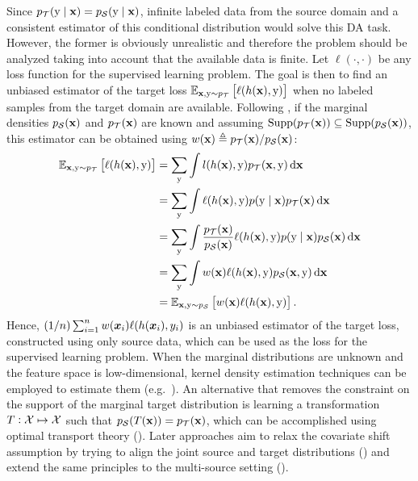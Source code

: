Since $p_{\mathcal{T}}({\textnormal{y}} \mid {\mathbf{x}}) = p_{\mathcal{S}}({\textnormal{y}} \mid {\mathbf{x}})$, infinite labeled data from the source domain and a consistent estimator of this conditional distribution would solve this DA task. However, the former is obviously unrealistic and therefore the problem should be analyzed taking into account that the available data is finite. Let $\ell(\cdot, \cdot)$ be any loss function for the supervised learning problem. The goal is then to find an unbiased estimator of the target loss $\mathbb{E}_{{\mathbf{x}}, {\textnormal{y}} \sim p_{\mathcal{T}}} \left[\ell(h({\mathbf{x}}),{\textnormal{y}})\right]$ when no labeled samples from the target domain are available. Following \citet{Sugiyama2007}, if the marginal densities $p_{\mathcal{S}}({\mathbf{x}})$ and $p_{\mathcal{T}}({\mathbf{x}})$ are known and assuming $\mathrm{Supp}(p_{\mathcal{T}}({\mathbf{x}})) \subseteq \mathrm{Supp}(p_{\mathcal{S}}({\mathbf{x}}))$, this estimator can be obtained using  $w({\mathbf{x}}) \triangleq p_{\mathcal{T}}({\mathbf{x}})/p_{\mathcal{S}}({\mathbf{x}})$:
\begin{align}
    \mathbb{E}_{{\mathbf{x}}, {\textnormal{y}} \sim p_{\mathcal{T}}} \left[\ell(h({\mathbf{x}}),{\textnormal{y}})\right] &= \sum_{{\textnormal{y}}} \int l(h({\mathbf{x}}),{\textnormal{y}}) p_{\mathcal{T}}({\mathbf{x}}, {\textnormal{y}}) {\,\text{d}}{\mathbf{x}} \nonumber\\
    &= \sum_{{\textnormal{y}}} \int \ell(h({\mathbf{x}}),{\textnormal{y}}) p({\textnormal{y}} \mid {\mathbf{x}}) p_{\mathcal{T}}({\mathbf{x}}) {\,\text{d}}{\mathbf{x}} \nonumber\\
    &= \sum_{{\textnormal{y}}} \int \frac{p_{\mathcal{T}}({\mathbf{x}})}{p_{\mathcal{S}}({\mathbf{x}})} \ell(h({\mathbf{x}}),{\textnormal{y}})  p({\textnormal{y}} \mid {\mathbf{x}}) p_{\mathcal{S}}({\mathbf{x}}) {\,\text{d}}{\mathbf{x}} \nonumber\\
    &= \sum_{{\textnormal{y}}} \int w({\mathbf{x}}) \ell(h({\mathbf{x}}),{\textnormal{y}})  p_{\mathcal{S}}({\mathbf{x}}, {\textnormal{y}}) {\,\text{d}}{\mathbf{x}} \nonumber\\
    &= \mathbb{E}_{{\mathbf{x}}, {\textnormal{y}} \sim p_{\mathcal{S}}} \left[w({\mathbf{x}}) \ell(h({\mathbf{x}}),{\textnormal{y}})\right].
\end{align}
Hence, $(1/n) \sum_{i=1}^{n} w({\bm{x}}_i) \ell(h({\bm{x}}_i),y_i)$ is an unbiased estimator of the target loss, constructed using only source data, which can be used as the loss for the supervised learning problem. When the marginal distributions are unknown and the feature space is low-dimensional, kernel density estimation techniques can be employed to estimate them (e.g.\ \citet{Shimodaira2000,Sugiyama2007,Cortes2010}). An alternative that removes the constraint on the support of the marginal target distribution is learning a transformation $T: {\mathcal{X}} \mapsto {\mathcal{X}}$ such that $p_{{\mathcal{S}}}(T({\mathbf{x}})) = p_{{\mathcal{T}}}({\mathbf{x}})$, which can be accomplished using optimal transport theory (\citet{Courty2015}). Later approaches aim to relax the covariate shift assumption by trying to align the joint source and target distributions (\citet{Courty2017}) and extend the same principles to the multi-source setting (\citet{Turrisi2020}).

